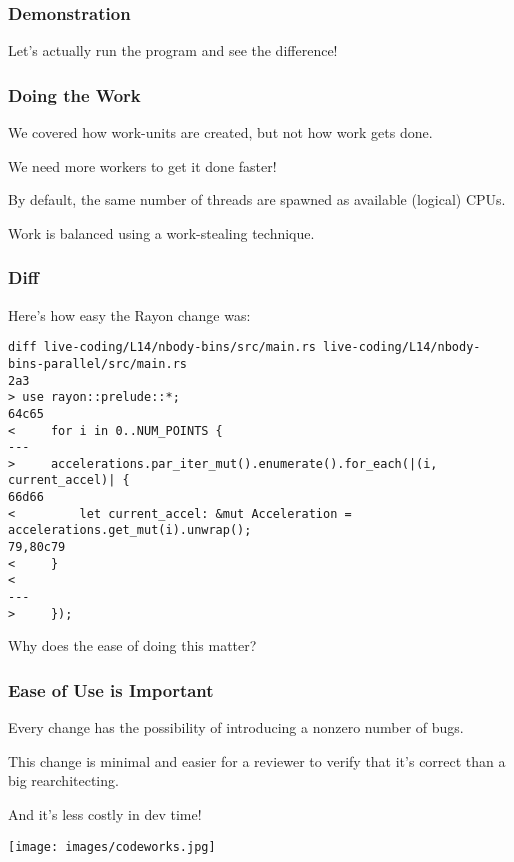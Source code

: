 \begin{frame}
\frametitle{Demonstration}

Let's actually run the program and see the difference!

\end{frame}



\begin{frame}
\frametitle{Doing the Work}

We covered how work-units are created, but not how work gets done.

We need more workers to get it done faster!

By default, the same number of threads are spawned as available (logical) CPUs.

Work is balanced using a work-stealing technique.

\end{frame}


\begin{frame}[fragile]
\frametitle{Diff}

Here's how easy the Rayon change was:

{\scriptsize 
\begin{verbatim}
diff live-coding/L14/nbody-bins/src/main.rs live-coding/L14/nbody-bins-parallel/src/main.rs
2a3
> use rayon::prelude::*;
64c65
<     for i in 0..NUM_POINTS {
---
>     accelerations.par_iter_mut().enumerate().for_each(|(i, current_accel)| {
66d66
<         let current_accel: &mut Acceleration = accelerations.get_mut(i).unwrap();
79,80c79
<     }
< 
---
>     });
\end{verbatim}
}

Why does the ease of doing this matter? 

\end{frame}

\begin{frame}
\frametitle{Ease of Use is Important}

Every change has the possibility of introducing a nonzero number of bugs. 

This change is minimal and easier for a reviewer to verify that it's correct than a big rearchitecting. 

And it's less costly in dev time!

\begin{center}
	\texttt{[image: images/codeworks.jpg]}
\end{center}


\end{frame}

